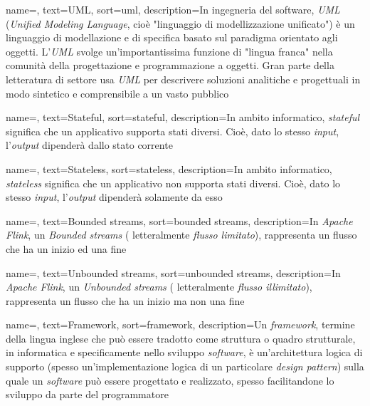 {
    name=,
    text=UML,
    sort=uml,
    description={In ingegneria del software, \textit{UML} (\textit{Unified Modeling Language}, cioè "linguaggio di modellizzazione unificato") è un linguaggio di modellazione e di specifica basato sul paradigma orientato agli oggetti. L'\textit{UML} svolge un'importantissima funzione di "lingua franca" nella comunità della progettazione e programmazione a oggetti. Gran parte della letteratura di settore usa \textit{UML} per descrivere soluzioni analitiche e progettuali in modo sintetico e comprensibile a un vasto pubblico}
}

{
    name=,
    text=Stateful,
    sort=stateful,
    description={In ambito informatico, \emph{stateful} significa che un applicativo supporta stati diversi. Cioè, dato lo stesso \textit{input}, l'\textit{output} dipenderà dallo stato corrente}
}

{
    name=,
    text=Stateless,
    sort=stateless,
    description={In ambito informatico, \emph{stateless} significa che un applicativo non supporta stati diversi. Cioè, dato lo stesso \textit{input}, l'\textit{output} dipenderà solamente da esso}
}

{
    name=,
    text=Bounded streams,
    sort=bounded streams,
    description={In \textit{Apache Flink}, un \textit{Bounded streams} ( letteralmente \textit{flusso limitato}), rappresenta un flusso che ha un inizio ed una fine}
}

{
    name=,
    text=Unbounded streams,
    sort=unbounded streams,
    description={In \textit{Apache Flink}, un \textit{Unbounded streams} ( letteralmente \textit{flusso illimitato}), rappresenta un flusso che ha un inizio ma non una fine}
}

{
    name=,
    text=Framework,
    sort=framework,
    description={Un \textit{framework}, termine della lingua inglese che può essere tradotto come struttura o quadro strutturale, in informatica e specificamente nello sviluppo \textit{software}, è un'architettura logica di supporto (spesso un'implementazione logica di un particolare \textit{design pattern}) sulla quale un \textit{software} può essere progettato e realizzato, spesso facilitandone lo sviluppo da parte del programmatore}
}


